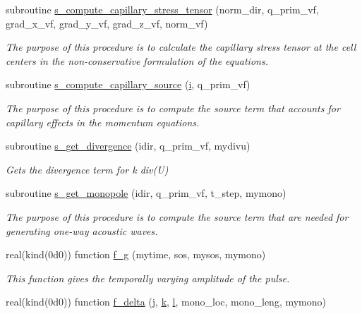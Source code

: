 \begin{DoxyCompactItemize}
subroutine \hyperlink{namespacem__rhs_af771a6193fc6e856bcbfc269f096e3c9}{s\+\_\+compute\+\_\+capillary\+\_\+stress\+\_\+tensor} (norm\+\_\+dir, q\+\_\+prim\+\_\+vf, grad\+\_\+x\+\_\+vf, grad\+\_\+y\+\_\+vf, grad\+\_\+z\+\_\+vf, norm\+\_\+vf)
\begin{DoxyCompactList}\small\item\em The purpose of this procedure is to calculate the capillary stress tensor at the cell centers in the non-\/conservative formulation of the equations. \end{DoxyCompactList}\item 
subroutine \hyperlink{namespacem__rhs_aca45586b8c966f8e3a5477444cf60dda}{s\+\_\+compute\+\_\+capillary\+\_\+source} (\hyperlink{m__rhs_8f90_aaea4baed8fd8b780f6938f0dc1fb0f72}{i}, q\+\_\+prim\+\_\+vf)
\begin{DoxyCompactList}\small\item\em The purpose of this procedure is to compute the source term that accounts for capillary effects in the momentum equations. \end{DoxyCompactList}\item 
subroutine \hyperlink{namespacem__rhs_aacbe385f29e71aa174541d4931bdcbbe}{s\+\_\+get\+\_\+divergence} (idir, q\+\_\+prim\+\_\+vf, mydivu)
\begin{DoxyCompactList}\small\item\em Gets the divergence term for k div(\+U) \end{DoxyCompactList}\item 
subroutine \hyperlink{namespacem__rhs_ae064d7adeace0bde4fc2b42d437a01b1}{s\+\_\+get\+\_\+monopole} (idir, q\+\_\+prim\+\_\+vf, t\+\_\+step, mymono)
\begin{DoxyCompactList}\small\item\em The purpose of this procedure is to compute the source term that are needed for generating one-\/way acoustic waves. \end{DoxyCompactList}\item 
real(kind(0d0)) function \hyperlink{namespacem__rhs_ad316cbfbf94736b4677bacf07d8d9027}{f\+\_\+g} (mytime, sos, mysos, mymono)
\begin{DoxyCompactList}\small\item\em This function gives the temporally varying amplitude of the pulse. \end{DoxyCompactList}\item 
real(kind(0d0)) function \hyperlink{namespacem__rhs_a87bc24802f4abe7b3cb36864d631a275}{f\+\_\+delta} (\hyperlink{m__rhs_8f90_aeadbc0ce9b66517f8fde156199772ec1}{j}, \hyperlink{m__rhs_8f90_af22c486581933c52df7d4aa306382074}{k}, \hyperlink{m__rhs_8f90_a2ac747380de0e6e5e11b01f4137fb75c}{l}, mono\+\_\+loc, mono\+\_\+leng, mymono)

\end{DoxyCompactItemize}
